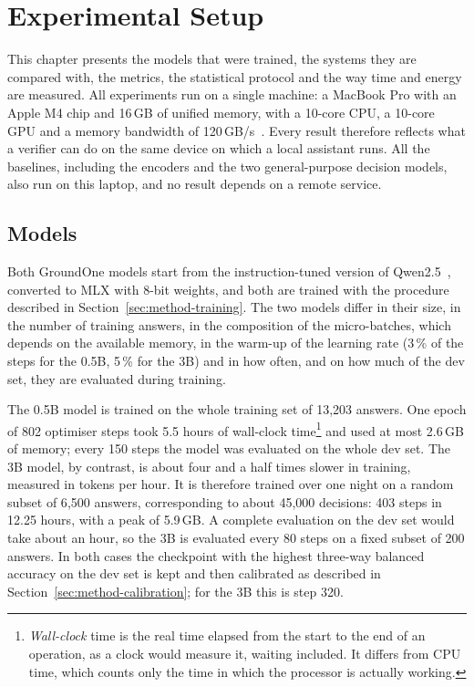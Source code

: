 \chapter{Experimental Setup}
\label{sec:setup}


This chapter presents the models that were trained, the systems they are compared with, the metrics, the statistical
protocol and the way time and energy are measured. All experiments run on a single machine: a MacBook Pro with an Apple
M4 chip and 16\,GB of unified memory, with a 10-core CPU, a 10-core GPU and a memory bandwidth of
120\,GB/s~\cite{apple2024m4specs}. Every result therefore reflects what a verifier can do on the same device on which a
local assistant runs. All the baselines, including the encoders and the two general-purpose decision models, also run
on this laptop, and no result depends on a remote service.

\section{Models}
\label{sec:setup-models}

Both GroundOne models start from the instruction-tuned version of Qwen2.5~\cite{qwen2024qwen25}, converted to MLX with
8-bit weights, and both are trained with the procedure described in Section~\ref{sec:method-training}. The two models differ in their size, in the number of training answers, in the composition of the micro-batches, which depends on the available memory, in the warm-up of the learning rate (3\,\% of the steps for the 0.5B, 5\,\% for the 3B) and in how often, and on how much of the dev set, they are evaluated during training.

The 0.5B model is trained on the whole training set of 13{,}203 answers. One epoch of 802 optimiser steps took 5.5 hours
of wall-clock time\footnote{\emph{Wall-clock} time is the real time elapsed from the start to the end of an operation,
as a clock would measure it, waiting included. It differs from CPU time, which counts only the time in which the
processor is actually working.} and used at most 2.6\,GB of memory; every 150 steps the model was evaluated on the whole
dev set. The 3B model, by contrast, is about four and a half times slower in training, measured in tokens per hour. It is therefore trained over one night on a
random subset of 6{,}500 answers, corresponding to about 45{,}000 decisions: 403 steps in 12.25 hours, with a peak of
5.9\,GB. A complete evaluation on the dev set would take about an hour, so the 3B is evaluated every 80 steps on a fixed
subset of 200 answers. In both cases the checkpoint with the highest three-way balanced accuracy on the dev set is kept
and then calibrated as described in Section~\ref{sec:method-calibration}; for the 3B this is step 320.

